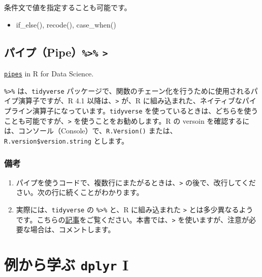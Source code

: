 \documentclass[
  xelatex, ja=standard]{bxjsbook}
\providecommand{\tightlist}{%
  \setlength{\itemsep}{0pt}\setlength{\parskip}{0pt}}
\theoremstyle{definition}
\theoremstyle{definition}
\theoremstyle{definition}
\theoremstyle{definition}
\theoremstyle{remark}
\begin{document}
条件文で値を指定することも可能です。

\begin{itemize}
\tightlist
\item
  if\_else(), recode(), case\_when()
\end{itemize}

\hypertarget{ux30d1ux30a4ux30d7pipe}{%
\subsection{\texorpdfstring{パイプ（Pipe）\texttt{\%\textgreater{}\%} \texttt{\textbar{}\textgreater{}}}{パイプ（Pipe）\%\textgreater\% \textbar\textgreater{}}}\label{ux30d1ux30a4ux30d7pipe}}

\href{https://r4ds.hadley.nz/workflow-style.html\#sec-pipes}{\texttt{pipes}} in R for Data Science.

\texttt{\%\textgreater{}\%} は、\texttt{tidyverse} パッケージで、関数のチェーン化を行うために使用されるパイプ演算子ですが、R 4.1 以降は、\texttt{\textbar{}\textgreater{}} が、R に組み込まれた、ネイティブなパイプライン演算子になっています。\texttt{tidyverse} を使っているときは、どちらを使うことも可能ですが、\texttt{\textbar{}\textgreater{}} を使うことをお勧めします。R の versoin を確認するには、コンソール（Console）で、\texttt{R.Version()} または、\texttt{R.version\$version.string} とします。

\hypertarget{ux5099ux8003-2}{%
\subsubsection{\texorpdfstring{\textbf{備考}}{備考}}\label{ux5099ux8003-2}}

\begin{enumerate}
\def\labelenumi{\arabic{enumi}.}
\item
  パイプを使うコードで、複数行にまたがるときは、\texttt{\textbar{}\textgreater{}} の後で、改行してください。次の行に続くことがわかります。
\item
  実際には、\texttt{tidyverse} の \texttt{\%\textgreater{}\%} と、R に組み込まれた \texttt{\textbar{}\textgreater{}} とは多少異なるようです。こちらの\href{https://www.tidyverse.org/blog/2023/04/base-vs-magrittr-pipe/}{記事}をご覧ください。本書では、\texttt{\textbar{}\textgreater{}} を使いますが、注意が必要な場合は、コメントします。
\end{enumerate}

\hypertarget{ux4f8bux304bux3089ux5b66ux3076-dplyr-i}{%
\section{\texorpdfstring{例から学ぶ \texttt{dplyr} I}{例から学ぶ dplyr I}}\label{ux4f8bux304bux3089ux5b66ux3076-dplyr-i}}
\end{document}
